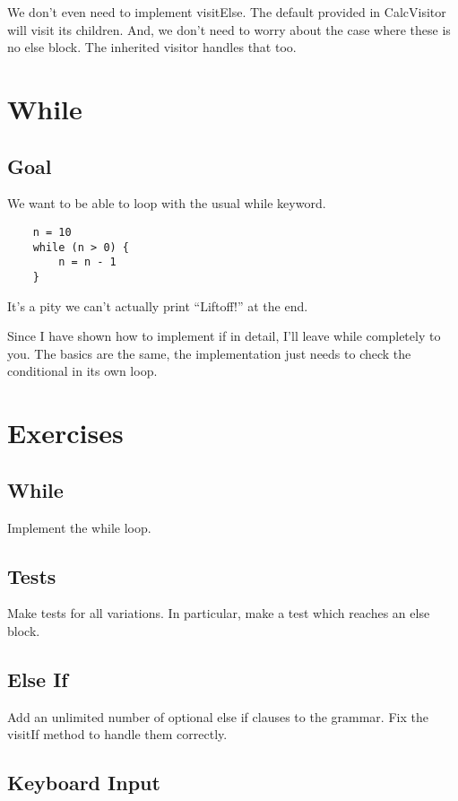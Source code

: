 We don't even need to implement visitElse. The default provided in
CalcVisitor will visit its children. And, we don't need to worry about
the case where these is no else block. The inherited visitor handles
that too.

\section{While}

\subsection{Goal}

We want to be able to loop with the usual while keyword.

{\footnotesize
\begin{verbatim}
    n = 10
    while (n > 0) {
        n = n - 1
    }
\end{verbatim}
}

It's a pity we can't actually print ``Liftoff!'' at the end.

Since I have shown how to implement if in detail, I'll leave while
completely to you. The basics are the same, the implementation just
needs to check the conditional in its own loop.

\section{Exercises}

\subsection{While}

Implement the while loop.

\subsection{Tests}

Make tests for all variations. In particular, make a test which reaches
an else block.

\subsection{Else If}

Add an unlimited number of optional else if clauses to the grammar.
Fix the visitIf method to handle them correctly.

\subsection{Keyboard Input}

